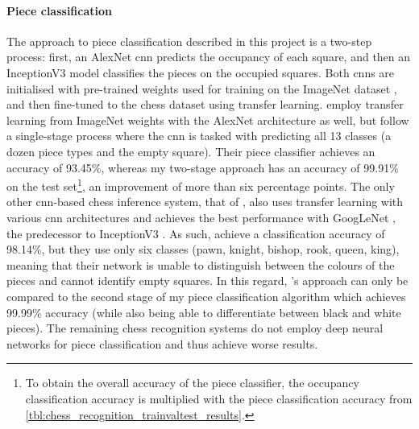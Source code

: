 \documentclass[../report.tex]{subfiles}
\begin{document}
\paragraph{Piece classification}
The approach to piece classification described in this project is a two-step process:
first, an AlexNet \cite{krizhevsky2017} \gls{cnn} predicts the occupancy of each square, and then an InceptionV3 \cite{szegedy2016} model classifies the pieces on the occupied squares. 
Both \glspl{cnn} are initialised with pre-trained weights used for training on the ImageNet dataset \cite{deng2009}, and then fine-tuned to the chess dataset using transfer learning.
\Textcite{mehta2020} employ transfer learning from ImageNet weights with the AlexNet architecture as well, but follow a single-stage process where the \gls{cnn} is tasked with predicting all 13 classes (a dozen piece types and the empty square).
Their piece classifier achieves an accuracy of 93.45\%, whereas my two-stage approach has an accuracy of 99.91\% on the test set\footnote{
    To obtain the overall accuracy of the piece classifier, the occupancy classification accuracy is multiplied with the piece classification accuracy from \cref{tbl:chess_recognition_trainvaltest_results}.
}, an improvement of more than six percentage points.
The only other \gls{cnn}-based chess inference system, that of \textcite{xie2018}, also uses transfer learning with various \gls{cnn} architectures and achieves the best performance with GoogLeNet \cite{szegedy2015}, the predecessor to InceptionV3 \cite{szegedy2016}.
As such, \citeauthor{xie2018} achieve a classification accuracy of 98.14\%, but they use only six classes (pawn, knight, bishop, rook, queen, king), meaning that their network is unable to distinguish between the colours of the pieces and cannot identify empty squares.
In this regard, \citeauthor{xie2018}'s approach can only be compared to the second stage of my piece classification algorithm which achieves 99.99\% accuracy (while also being able to differentiate between black and white pieces).
The remaining chess recognition systems do not employ deep neural networks for piece classification and thus achieve worse results.
\end{document}
